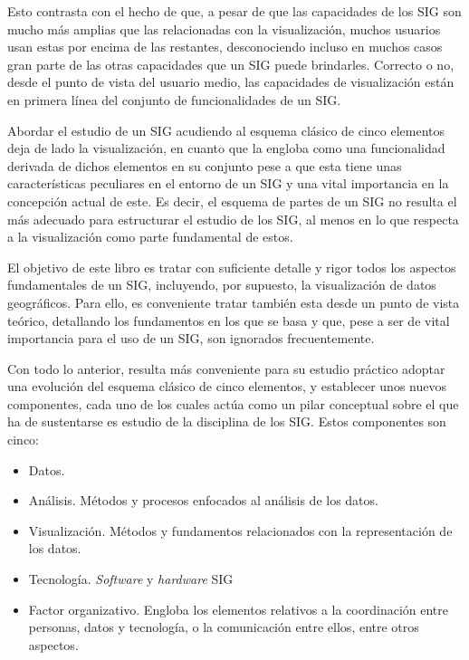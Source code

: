 Esto contrasta con el hecho de que, a pesar de que las capacidades de los SIG son mucho más amplias que las relacionadas con la visualización, muchos usuarios usan estas por encima de las restantes, desconociendo incluso en muchos casos gran parte de las otras capacidades que un SIG puede brindarles. Correcto o no, desde el punto de vista del usuario medio, las capacidades de visualización están en primera línea del conjunto de funcionalidades de un SIG.

Abordar el estudio de un SIG acudiendo al esquema clásico de cinco elementos deja de lado la visualización, en cuanto que la engloba como una funcionalidad derivada de dichos elementos en su conjunto pese a que esta tiene unas características peculiares en el entorno de un SIG y una vital importancia en la concepción actual de este. Es decir, el esquema de partes de un SIG no resulta el más adecuado para estructurar el estudio de los SIG, al menos en lo que respecta a la visualización como parte fundamental de estos.

El objetivo de este libro es tratar con suficiente detalle y rigor todos los aspectos fundamentales de un SIG, incluyendo, por supuesto, la visualización de datos geográficos. Para ello, es conveniente tratar también esta desde un punto de vista teórico, detallando los fundamentos en los que se basa y que, pese a ser de vital importancia para el uso de un SIG, son ignorados frecuentemente. 

Con todo lo anterior, resulta más conveniente para su estudio práctico adoptar una evolución del esquema clásico de cinco elementos, y establecer unos nuevos componentes, cada uno de los cuales actúa como un pilar conceptual sobre el que ha de sustentarse es estudio de la disciplina de los SIG. Estos componentes son cinco:

\begin{itemize}
 \item Datos.
\item Análisis. Métodos y procesos enfocados al análisis de los datos.
\item Visualización. Métodos y fundamentos relacionados con la representación de los datos. 
\item Tecnología. \emph{Software} y \emph{hardware} SIG
\item Factor organizativo. Engloba los elementos relativos a la coordinación entre personas, datos y tecnología, o la comunicación entre ellos, entre otros aspectos.
\end{itemize}

